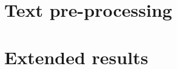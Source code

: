 \documentclass[magisterska,en]{mgr}
\begin{document}
\appendix

\chapter{Text pre-processing}\label{r:text_preparation}


\chapter{Extended results}\label{r:extended_results}




\printbibliography[heading=bibintoc]
\end{document}
